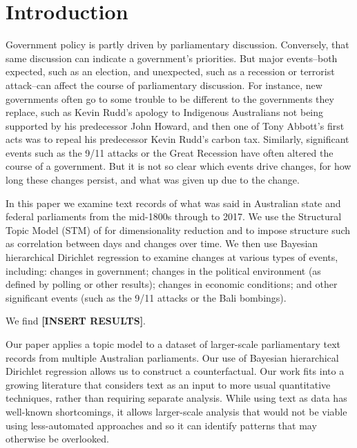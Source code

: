 \documentclass[12pt,]{article}
\theoremstyle{definition}
\theoremstyle{definition}
\theoremstyle{definition}
\theoremstyle{remark}
\begin{document}
\vskip 6.5pt


\noindent  \section{Introduction}\label{introduction}

Government policy is partly driven by parliamentary discussion.
Conversely, that same discussion can indicate a government's priorities.
But major events--both expected, such as an election, and unexpected,
such as a recession or terrorist attack--can affect the course of
parliamentary discussion. For instance, new governments often go to some
trouble to be different to the governments they replace, such as Kevin
Rudd's apology to Indigenous Australians not being supported by his
predecessor John Howard, and then one of Tony Abbott's first acts was to
repeal his predecessor Kevin Rudd's carbon tax. Similarly, significant
events such as the 9/11 attacks or the Great Recession have often
altered the course of a government. But it is not so clear which events
drive changes, for how long these changes persist, and what was given up
due to the change.

In this paper we examine text records of what was said in Australian
state and federal parliaments from the mid-1800s through to 2017. We use
the Structural Topic Model (STM) of \citet{RobertsStewartAiroldi2016}
for dimensionality reduction and to impose structure such as correlation
between days and changes over time. We then use Bayesian hierarchical
Dirichlet regression to examine changes at various types of events,
including: changes in government; changes in the political environment
(as defined by polling or other results); changes in economic
conditions; and other significant events (such as the 9/11 attacks or
the Bali bombings).

We find \textbf{{[}INSERT RESULTS{]}}.

Our paper applies a topic model to a dataset of larger-scale
parliamentary text records from multiple Australian parliaments. Our use
of Bayesian hierarchical Dirichlet regression allows us to construct a
counterfactual. Our work fits into a growing literature that considers
text as an input to more usual quantitative techniques, rather than
requiring separate analysis. While using text as data has well-known
shortcomings, it allows larger-scale analysis that would not be viable
using less-automated approaches and so it can identify patterns that may
otherwise be overlooked.
\end{document}

